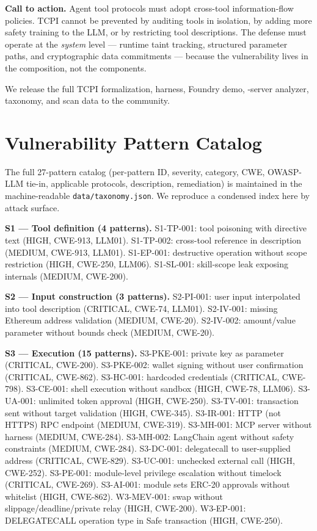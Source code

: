\documentclass[conference]{IEEEtran}
\begin{document}
\textbf{Call to action.}  Agent tool protocols must adopt cross-tool
information-flow policies.  TCPI cannot be prevented by auditing tools
in isolation, by adding more safety training to the LLM, or by
restricting tool descriptions.  The defense must operate at the
\emph{system} level --- runtime taint tracking, structured parameter
paths, and cryptographic data commitments --- because the
vulnerability lives in the composition, not the components.

We release the full TCPI formalization, harness, Foundry demo,
\scanTotalRepos-server analyzer, taxonomy, and scan data to the community.



\appendices

\section{Vulnerability Pattern Catalog}

The full 27-pattern catalog (per-pattern ID, severity, category, CWE,
OWASP-LLM tie-in, applicable protocols, description, remediation) is
maintained in the machine-readable \texttt{data/taxonomy.json}.  We
reproduce a condensed index here by attack surface.

\textbf{S1 --- Tool definition (4 patterns).}
S1-TP-001: tool poisoning with directive text (HIGH, CWE-913, LLM01).
S1-TP-002: cross-tool reference in description (MEDIUM, CWE-913,
LLM01).
S1-EP-001: destructive operation without scope restriction (HIGH,
CWE-250, LLM06).
S1-SL-001: skill-scope leak exposing internals (MEDIUM, CWE-200).

\textbf{S2 --- Input construction (3 patterns).}
S2-PI-001: user input interpolated into tool description (CRITICAL,
CWE-74, LLM01).
S2-IV-001: missing Ethereum address validation (MEDIUM, CWE-20).
S2-IV-002: amount/value parameter without bounds check (MEDIUM,
CWE-20).

\textbf{S3 --- Execution (15 patterns).}
S3-PKE-001: private key as parameter (CRITICAL, CWE-200).
S3-PKE-002: wallet signing without user confirmation (CRITICAL,
CWE-862).
S3-HC-001: hardcoded credentials (CRITICAL, CWE-798).
S3-CE-001: shell execution without sandbox (HIGH, CWE-78, LLM06).
S3-UA-001: unlimited token approval (HIGH, CWE-250).
S3-TV-001: transaction sent without target validation (HIGH, CWE-345).
S3-IR-001: HTTP (not HTTPS) RPC endpoint (MEDIUM, CWE-319).
S3-MH-001: MCP server without harness (MEDIUM, CWE-284).
S3-MH-002: LangChain agent without safety constraints (MEDIUM,
CWE-284).
S3-DC-001: delegatecall to user-supplied address (CRITICAL, CWE-829).
S3-UC-001: unchecked external call (HIGH, CWE-252).
S3-PE-001: module-level privilege escalation without timelock
(CRITICAL, CWE-269).
S3-AI-001: module sets ERC-20 approvals without whitelist (HIGH,
CWE-862).
W3-MEV-001: swap without slippage/deadline/private relay (HIGH,
CWE-200).
W3-EP-001: DELEGATECALL operation type in Safe transaction (HIGH,
CWE-250).
\end{document}
